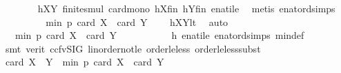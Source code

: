\begin{isabellebody}
\ \ \ \ \ \ \isamarkupfalse%
\ hXY{}\ finite{\isacharunderscore}{\kern0pt}smul\ card{\isacharunderscore}{\kern0pt}mono\ hXfin\ hYfin\ enat{\isacharunderscore}{\kern0pt}ile\ \isamarkupfalse%
\ {\isacharparenleft}{\kern0pt}metis\ enat{\isacharunderscore}{\kern0pt}ord{\isacharunderscore}{\kern0pt}simps{\isacharparenleft}{\kern0pt}{}{\isacharparenright}{\kern0pt}{\isacharparenright}{\kern0pt}\isanewline
\ \ \ \ \isamarkupfalse%
\ \isamarkupfalse%
\ {\isachardoublequoteopen}{\isachardot}{\kern0pt}{\isachardot}{\kern0pt}{\isachardot}{\kern0pt}\ {\isacharless}{\kern0pt}\ min\ p\ {\isacharparenleft}{\kern0pt}card\ X\ {\isacharplus}{\kern0pt}\ card\ Y\ {\isacharminus}{\kern0pt}\ {}{\isacharparenright}{\kern0pt}{\isachardoublequoteclose}\ \isamarkupfalse%
\ hXYlt\ \isamarkupfalse%
\ auto\isanewline
\ \ \ \ \isamarkupfalse%
\ \isamarkupfalse%
\ {\isachardoublequoteopen}{\isachardot}{\kern0pt}{\isachardot}{\kern0pt}{\isachardot}{\kern0pt}\ {\isasymle}\ min\ p\ {\isacharparenleft}{\kern0pt}card\ {\isacharquery}{\kern0pt}X{}\ {\isacharplus}{\kern0pt}\ card\ {\isacharquery}{\kern0pt}Y{}\ {\isacharminus}{\kern0pt}\ {}{\isacharparenright}{\kern0pt}{\isachardoublequoteclose}\ \isanewline
\ \ \ \ \ \ \isamarkupfalse%
\ h\ enat{\isacharunderscore}{\kern0pt}ile\ enat{\isacharunderscore}{\kern0pt}ord{\isacharunderscore}{\kern0pt}simps{\isacharparenleft}{\kern0pt}{}{\isacharparenright}{\kern0pt}\ min{\isacharunderscore}{\kern0pt}def\isanewline
\ \ \ \ \ \ \isamarkupfalse%
\ {\isacharparenleft}{\kern0pt}smt\ {\isacharparenleft}{\kern0pt}verit{\isacharcomma}{\kern0pt}\ ccfv{\isacharunderscore}{\kern0pt}SIG{\isacharparenright}{\kern0pt}\ linorder{\isacharunderscore}{\kern0pt}not{\isacharunderscore}{\kern0pt}le\ order{\isacharunderscore}{\kern0pt}le{\isacharunderscore}{\kern0pt}less\ order{\isacharunderscore}{\kern0pt}le{\isacharunderscore}{\kern0pt}less{\isacharunderscore}{\kern0pt}subst{}{\isacharparenright}{\kern0pt}\isanewline
\ \ \ \ \isamarkupfalse%
\ \isamarkupfalse%
\ {\isachardoublequoteopen}card\ {\isacharparenleft}{\kern0pt}{\isacharquery}{\kern0pt}X{}\ {\isasymcdots}\ {\isacharquery}{\kern0pt}Y{}{\isacharparenright}{\kern0pt}\ {\isacharless}{\kern0pt}\ min\ p\ {\isacharparenleft}{\kern0pt}card\ {\isacharquery}{\kern0pt}X{}\ {\isacharplus}{\kern0pt}\ card\ {\isacharquery}{\kern0pt}Y{}\ {\isacharminus}{\kern0pt}\ {}{\isacharparenright}{\kern0pt}{\isachardoublequoteclose}\ \isamarkupfalse%

\end{isabellebody}
